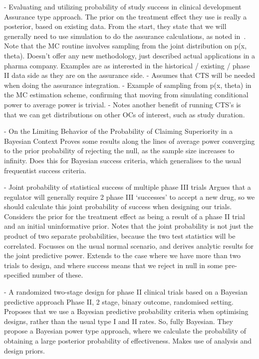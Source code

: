 \documentclass{article} %
\begin{document}
\cite{Wang2013} - Evaluating and utilizing probability of study success in clinical development
Assurance type approach. The prior on the treatment effect they use is really a posterior, based on existing data. From the start, they state that we will generally need to use simulation to do the assurance calculations, as noted in~\cite{OHagan2005}. Note that the MC routine involves sampling from the joint distribution on p(x, theta). Doesn't offer any new methodology, just described actual applications in a pharma company. Examples are as interested in the historical / existing / phase II data side as they are on the assurance side.
- Assumes that CTS will be needed when doing the assurance integration.
- Example of sampling from p(x, theta) in the MC estimation scheme, confirming that moving from simulating conditional power to average power is trivial.
- Notes another benefit of running CTS's is that we can get distributions on other OCs of interest, such as study duration.

\cite{Eaton2013} - On the Limiting Behavior of the Probability of Claiming Superiority in a Bayesian Context
Proves some results along the lines of average power converging to the prior probability of rejecting the null, as the sample size increases to infinity. Does this for Bayesian success criteria, which generalises to the usual frequentist success criteria.

\cite{Zhang2013} - Joint probability of statistical success of multiple phase {III} trials
Argues that a regulator will generally require 2 phase III `successes' to accept a new drug, so we should calculate this joint probability of success when designing our trials. Considers the prior for the treatment effect as being a result of a phase II trial and an initial uninformative prior. Notes that the joint probability is not just the product of two separate probabilities, because the two test statistics will be correlated. Focusses on the usual normal scenario, and derives analytic results for the joint predictive power. Extends to the case where we have more than two trials to design, and where success means that we reject in null in some pre-specified number of these.

\cite{Cellamare2014} - A randomized two-stage design for phase II clinical trials based on a Bayesian predictive approach
Phase II, 2 stage, binary outcome, randomised setting. Proposes that we use a Bayesian predictive probability criteria when optimising designs, rather than the usual type I and II rates. So, fully Bayesian. They propose a Bayesian power type approach, where we calculate the probability of obtaining a large posterior probability of effectiveness. Makes use of analysis and design priors. 
\end{document}
